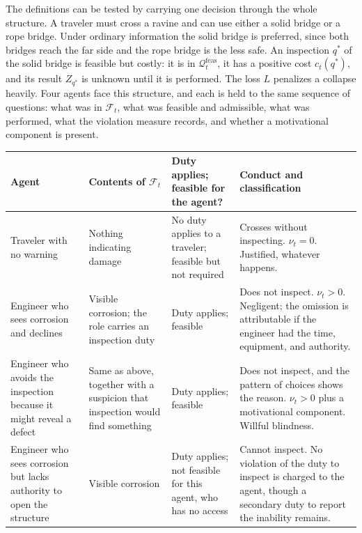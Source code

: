 \documentclass[11pt]{article}
\newcommand{\F}{\mathcal F}
\newcommand{\Q}{\mathcal Q}
\newcommand{\feas}{\mathrm{feas}}
\theoremstyle{definition}
\begin{document}
The definitions can be tested by carrying one decision through the whole structure. A traveler must cross a ravine and can use either a solid bridge or a rope bridge. Under ordinary information the solid bridge is preferred, since both bridges reach the far side and the rope bridge is the less safe. An inspection $q^{\ast}$ of the solid bridge is feasible but costly: it is in $\Q_t^{\feas}$, it has a positive cost $c_t(q^{\ast})$, and its result $Z_{q^{\ast}}$ is unknown until it is performed. The loss $L$ penalizes a collapse heavily. Four agents face this structure, and each is held to the same sequence of questions: what was in $\F_t$, what was feasible and admissible, what was performed, what the violation measure records, and whether a motivational component is present.

\begin{center}
\small
\renewcommand{\arraystretch}{1.25}
\begin{tabular}{p{2.6cm}p{3.2cm}p{2.5cm}p{3.7cm}}
\hline
Agent & Contents of $\F_t$ & Duty applies; feasible for the agent? & Conduct and classification \\
\hline
Traveler with no warning & Nothing indicating damage & No duty applies to a traveler; feasible but not required & Crosses without inspecting. $\nu_t=0$. Justified, whatever happens. \\
Engineer who sees corrosion and declines & Visible corrosion; the role carries an inspection duty & Duty applies; feasible & Does not inspect. $\nu_t>0$. Negligent; the omission is attributable if the engineer had the time, equipment, and authority. \\
Engineer who avoids the inspection because it might reveal a defect & Same as above, together with a suspicion that inspection would find something & Duty applies; feasible & Does not inspect, and the pattern of choices shows the reason. $\nu_t>0$ plus a motivational component. Willful blindness. \\
Engineer who sees corrosion but lacks authority to open the structure & Visible corrosion & Duty applies; not feasible for this agent, who has no access & Cannot inspect. No violation of the duty to inspect is charged to the agent, though a secondary duty to report the inability remains. \\
\hline
\end{tabular}
\end{center}
\end{document}
